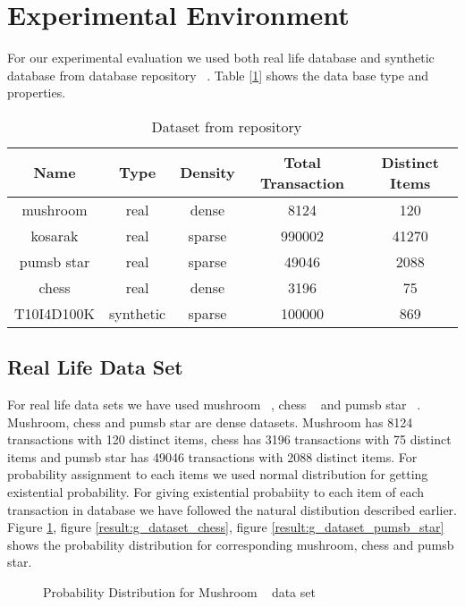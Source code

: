 \section{Experimental Environment}
For our experimental evaluation we used both real life database and synthetic database from database repository ~\cite{dataset}. Table [\ref{table:dataset}] shows the data base type and properties.
		\begin{table}[h]
		\centering
		\begin{tabular}{|c|c|c|c|c|}
		\hline 
		Name		&	Type	&	Density	&	Total Transaction 	&	Distinct Items	\\ \hline \hline
		mushroom	&	real	&	dense	&	8124	&	120							\\ \hline
		kosarak		&	real	&	sparse	&	990002	&	41270						\\ \hline
		pumsb star	&	real	&	sparse	&	49046	&	2088						\\ \hline
		chess		&	real	&	dense	&	3196	&	75							\\ \hline
		T10I4D100K	&	synthetic	&	sparse	&	100000	&	869						\\ \hline
			\end{tabular}
		\caption{Dataset from repository ~\cite{dataset}}
		\label{table:dataset}
		\end{table}


\subsection{Real Life Data Set}
For real life data sets we have used mushroom ~\cite{dataset}, chess ~\cite{dataset} and pumsb star ~\cite{dataset}. Mushroom, chess and pumsb star are dense datasets. Mushroom has 8124 transactions with 120 distinct items, chess has 3196 transactions with 75 distinct items and pumsb star has 49046 transactions with 2088 distinct items. For probability assignment to each items we used normal distribution for getting existential probability. For giving existential probabiity to each item of each transaction in database we have followed the natural distibution described earlier. Figure \ref{result:g_dataset_mushroom}, figure \ref{result:g_dataset_chess}, figure \ref{result:g_dataset_pumsb_star} shows the probability distribution for corresponding mushroom, chess and pumsb star.
		\begin{figure}[h]
		\centering
			
		\caption{Probability Distribution for Mushroom ~\cite{dataset} data set}
		\label{result:g_dataset_mushroom}
		\end{figure}
		
